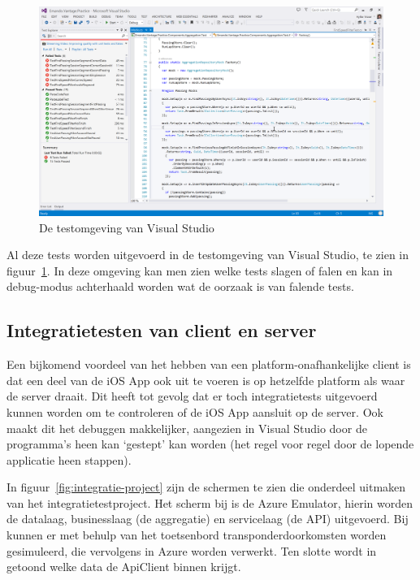\begin{figure}
  \begin{center}
  \includegraphics[width=\textwidth]{style/images/screenshots/Testing}    
  \end{center}
  \caption{De testomgeving van Visual Studio}  
  \label{fig:visual-studio-testing}
\end{figure}

Al deze tests worden uitgevoerd in de testomgeving van Visual Studio, te zien in figuur~\ref{fig:visual-studio-testing}. In deze omgeving kan men zien welke tests slagen of falen en kan in debug-modus achterhaald worden wat de oorzaak is van falende tests. 

\subsection{Integratietesten van client en server}
Een bijkomend voordeel van het hebben van een platform-onafhankelijke client is dat een deel van de iOS App ook uit te voeren is op hetzelfde platform als waar de server draait. Dit heeft tot gevolg dat er toch integratietests uitgevoerd kunnen worden om te controleren of de iOS App aansluit op de server. Ook maakt dit het debuggen makkelijker, aangezien in Visual Studio door de programma's heen kan `gestept' kan worden (het regel voor regel door de lopende applicatie heen stappen).

In figuur~\ref{fig:integratie-project} zijn de schermen te zien die onderdeel uitmaken van het integratietestproject. Het scherm bij  is de Azure Emulator, hierin worden de datalaag, businesslaag (de aggregatie) en servicelaag (de API) uitgevoerd. Bij  kunnen er met behulp van het toetsenbord transponderdoorkomsten worden gesimuleerd, die vervolgens in Azure worden verwerkt. Ten slotte wordt in  getoond welke data de ApiClient binnen krijgt.

